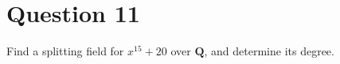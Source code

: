 \section{Question 11}

\begin{question}
    Find a splitting field for $x^{15}+20$ over $\mathbf{Q}$, and determine its degree.
\end{question}

\begin{answer}
    
\end{answer}